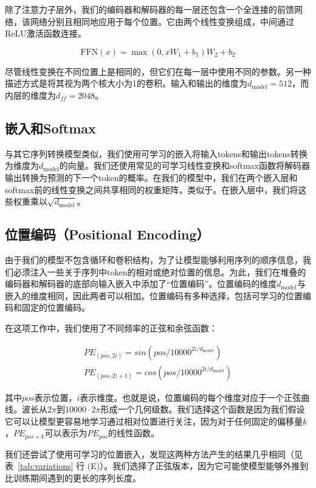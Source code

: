 \documentclass[lang=cn,a4paper,newtx]{elegantpaper}
\newcommand{\dmodel}{d_{\text{model}}}
\begin{document}
除了注意力子层外，我们的编码器和解码器的每一层还包含一个全连接的前馈网络，该网络分别且相同地应用于每个位置。它由两个线性变换组成，中间通过ReLU激活函数连接。

\begin{equation}
  \mathrm{FFN}(x)=\max(0, xW_1 + b_1) W_2 + b_2
\end{equation}

尽管线性变换在不同位置上是相同的，但它们在每一层中使用不同的参数。另一种描述方式是将其视为两个核大小为1的卷积。输入和输出的维度为$\dmodel=512$，而内层的维度为$d_{ff}=2048$。

\subsection{嵌入和Softmax}

与其它序列转换模型类似，我们使用可学习的嵌入将输入tokens和输出tokens转换为维度为$\dmodel$的向量。我们还使用常见的可学习线性变换和softmax函数将解码器输出转换为预测的下一个token的概率。在我们的模型中，我们在两个嵌入层和softmax前的线性变换之间共享相同的权重矩阵，类似于。在嵌入层中，我们将这些权重乘以$\sqrt{\dmodel}$。

\subsection{位置编码（Positional Encoding）}

由于我们的模型不包含循环和卷积结构，为了让模型能够利用序列的顺序信息，我们必须注入一些关于序列中token的相对或绝对位置的信息。为此，我们在堆叠的编码器和解码器的底部向输入嵌入中添加了“位置编码”。位置编码的维度$\dmodel$与嵌入的维度相同，因此两者可以相加。位置编码有多种选择，包括可学习的位置编码和固定的位置编码。

在这项工作中，我们使用了不同频率的正弦和余弦函数：

\begin{align*}
  PE_{(pos,2i)} = sin(pos / 10000^{2i/\dmodel}) \\
  PE_{(pos,2i+1)} = cos(pos / 10000^{2i/\dmodel})
\end{align*}

其中$pos$表示位置，$i$表示维度。也就是说，位置编码的每个维度对应于一个正弦曲线。波长从$2\pi$到$10000 \cdot 2\pi$形成一个几何级数。我们选择这个函数是因为我们假设它可以让模型更容易地学习通过相对位置进行关注，因为对于任何固定的偏移量$k$，$PE_{pos+k}$可以表示为$PE_{pos}$的线性函数。

我们还尝试了使用可学习的位置嵌入，发现这两种方法产生的结果几乎相同（见表~\ref{tab:variations} 行 (E)）。我们选择了正弦版本，因为它可能使模型能够外推到比训练期间遇到的更长的序列长度。
\end{document}
